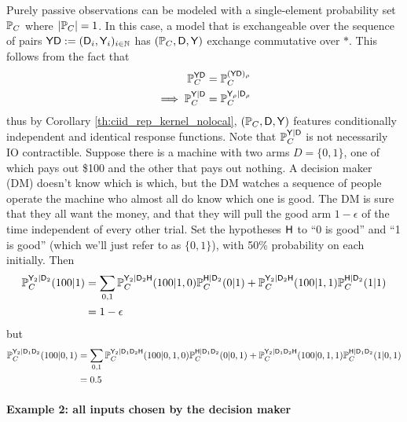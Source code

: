 Purely passive observations can be modeled with a single-element probability set $\mathbb{P}_C$ where $|\mathbb{P}_C|=1$. In this case, a model that is exchangeable over the sequence of pairs $\mathsf{YD}:=(\mathsf{D}_i,\mathsf{Y}_i)_{i\in \mathbb{N}}$ has $(\mathbb{P}_C, \mathsf{D},\mathsf{Y})$ exchange commutative over $*$. This follows from the fact that
\begin{align}{}
    \mathbb{P}_C^{\mathsf{YD}} &= \mathbb{P}_C^{(\mathsf{Y}\mathsf{D})_\rho}\\
    \implies \mathbb{P}_C^{\mathsf{Y}|\mathsf{D}} &= \mathbb{P}_C^{\mathsf{Y}_\rho|\mathsf{D}_\rho}
\end{align}
thus by Corollary \ref{th:ciid_rep_kernel_nolocal}, $(\mathbb{P}_C, \mathsf{D},\mathsf{Y})$ features conditionally independent and identical response functions. Note that $\mathbb{P}_C^{\mathsf{Y}|\mathsf{D}}$ is not necessarily IO contractible. Suppose there is a machine with two arms $D=\{0,1\}$, one of which pays out \$100 and the other that pays out nothing. A decision maker (DM) doesn't know which is which, but the DM watches a sequence of people operate the machine who almost all do know which one is good. The DM is sure that they all want the money, and that they will pull the good arm $1-\epsilon$ of the time independent of every other trial. Set the hypotheses $\mathsf{H}$ to ``0 is good'' and ``1 is good'' (which we'll just refer to as $\{0,1\}$), with 50\% probability on each initially. Then
\begin{align}
    \mathbb{P}_C^{\mathsf{Y}_2|\mathsf{D}_2}(100|1) &= \sum_{0,1} \mathbb{P}_C^{\mathsf{Y}_2|\mathsf{D}_2\mathsf{H}}(100|1,0)\mathbb{P}_C^{\mathsf{H}|\mathsf{D}_2}(0|1) + \mathbb{P}_C^{\mathsf{Y}_2|\mathsf{D}_2\mathsf{H}}(100|1,1)\mathbb{P}_C^{\mathsf{H}|\mathsf{D}_2}(1|1)\\
    &= 1-\epsilon
\end{align}
but
\begin{align}
    \mathbb{P}_C^{\mathsf{Y}_2|\mathsf{D}_1\mathsf{D}_2}(100|0,1) &= \sum_{0,1} \mathbb{P}_C^{\mathsf{Y}_2|\mathsf{D}_1\mathsf{D}_2\mathsf{H}}(100|0,1,0)\mathbb{P}_C^{\mathsf{H}|\mathsf{D}_1\mathsf{D}_2}(0|0,1) + \mathbb{P}_C^{\mathsf{Y}_2|\mathsf{D}_1\mathsf{D}_2\mathsf{H}}(100|0,1,1)\mathbb{P}_C^{\mathsf{H}|\mathsf{D}_1\mathsf{D}_2}(1|0,1)\\
    &= 0.5
\end{align}

\paragraph{Example 2: all inputs chosen by the decision maker}

